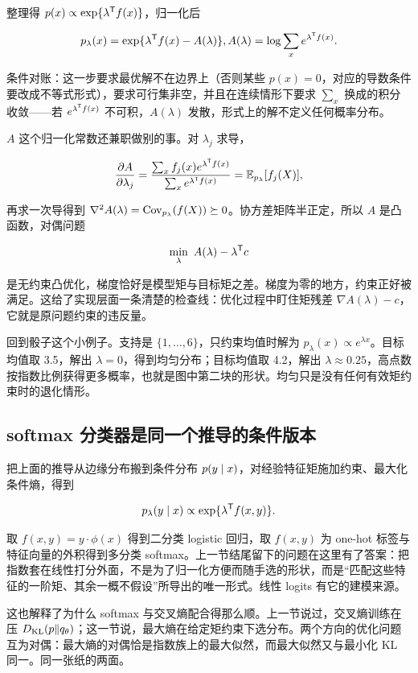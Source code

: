 整理得 \(p(x)\propto\exp\{\lambda^{\mathsf{T}}f(x)\}\)，归一化后

\[
p_\lambda(x)=\exp\{\lambda^{\mathsf{T}}f(x)-A(\lambda)\},
\space
A(\lambda)=\log\sum_x e^{\lambda^{\mathsf{T}}f(x)}.
\]

条件对账：这一步要求最优解不在边界上（否则某些 \(p(x)=0\)，对应的导数条件要改成不等式形式），要求可行集非空，并且在连续情形下要求 \(\sum_x\) 换成的积分收敛——若 \(e^{\lambda^{\mathsf{T}}f(x)}\) 不可积，\(A(\lambda)\) 发散，形式上的解不定义任何概率分布。

\(A\) 这个归一化常数还兼职做别的事。对 \(\lambda_j\) 求导，

\[
\frac{\partial A}{\partial\lambda_j}
=\frac{\sum_x f_j(x)e^{\lambda^{\mathsf{T}}f(x)}}{\sum_x e^{\lambda^{\mathsf{T}}f(x)}}
=\mathbb{E}_{p_\lambda}[f_j(X)],
\]

再求一次导得到 \(\nabla^2A(\lambda)=\operatorname{Cov}_{p_\lambda}(f(X))\succeq 0\)。协方差矩阵半正定，所以 \(A\) 是凸函数，对偶问题

\[
\min_\lambda\ A(\lambda)-\lambda^{\trans}c
\]

是无约束凸优化，梯度恰好是模型矩与目标矩之差。梯度为零的地方，约束正好被满足。这给了实现层面一条清楚的检查线：优化过程中盯住矩残差 \(\nabla A(\lambda)-c\)，它就是原问题约束的违反量。

回到骰子这个小例子。支持是 \(\{1,\ldots,6\}\)，只约束均值时解为 \(p_\lambda(x)\propto e^{\lambda x}\)。目标均值取 3.5，解出 \(\lambda=0\)，得到均匀分布；目标均值取 4.2，解出 \(\lambda\approx 0.25\)，高点数按指数比例获得更多概率，也就是图中第二块的形状。均匀只是没有任何有效矩约束时的退化情形。

\subsection{softmax 分类器是同一个推导的条件版本}

把上面的推导从边缘分布搬到条件分布 \(p(y\mid x)\)，对经验特征矩施加约束、最大化条件熵，得到

\[
p_\lambda(y\mid x)\propto\exp\{\lambda^{\mathsf{T}}f(x,y)\}.
\]

取 \(f(x,y)=y\cdot\phi(x)\) 得到二分类 logistic 回归，取 \(f(x,y)\) 为 one-hot 标签与特征向量的外积得到多分类 softmax。上一节结尾留下的问题在这里有了答案：把指数套在线性打分外面，不是为了归一化方便而随手选的形状，而是``匹配这些特征的一阶矩、其余一概不假设''所导出的唯一形式。线性 logits 有它的建模来源。

这也解释了为什么 softmax 与交叉熵配合得那么顺。上一节说过，交叉熵训练在压 \(D_{\mathrm{KL}}(p\|q_\theta)\)；这一节说，最大熵在给定矩约束下选分布。两个方向的优化问题互为对偶：最大熵的对偶恰是指数族上的最大似然，而最大似然又与最小化 KL 同一。同一张纸的两面。

